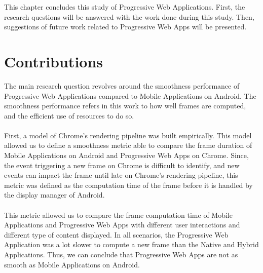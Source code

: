 \documentclass{kththesis}
\begin{document}
This chapter concludes this study of Progressive Web Applications. First, the research questions will be answered with the work done during this study. Then, suggestions of future work related to Progressive Web Apps will be presented.


\section{Contributions}

The main research question revolves around the smoothness performance of Progressive Web Applications compared to Mobile Applications on Android. The smoothness performance refers in this work to how well frames are computed, and the efficient use of resources to do so. 
\paragraph{}
First, a model of Chrome's rendering pipeline was built empirically. This model allowed us to define a smoothness metric able to compare the frame duration of Mobile Applications on Android and Progressive Web Apps on Chrome. Since, the event triggering a new frame on Chrome is difficult to identify, and new events can impact the frame until late on Chrome's rendering pipeline, this metric was defined as the computation time of the frame before it is handled by the display manager of Android. 
\paragraph{}
This metric allowed us to compare the frame computation time of Mobile Applications and Progressive Web Apps with different user interactions and different type of content displayed. In all scenarios, the Progressive Web Application was a lot slower to compute a new frame than the Native and Hybrid Applications. Thus, we can conclude that Progressive Web Apps are not as smooth as Mobile Applications on Android.
\end{document}
